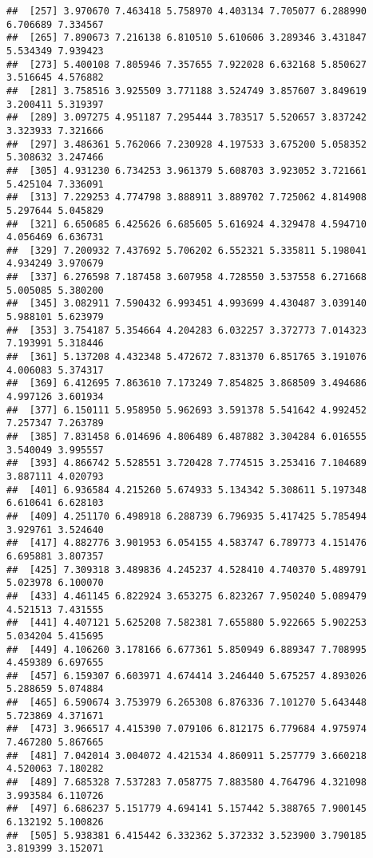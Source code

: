 \documentclass[
]{article}
\begin{document}
\begin{verbatim}
##  [257] 3.970670 7.463418 5.758970 4.403134 7.705077 6.288990 6.706689 7.334567
##  [265] 7.890673 7.216138 6.810510 5.610606 3.289346 3.431847 5.534349 7.939423
##  [273] 5.400108 7.805946 7.357655 7.922028 6.632168 5.850627 3.516645 4.576882
##  [281] 3.758516 3.925509 3.771188 3.524749 3.857607 3.849619 3.200411 5.319397
##  [289] 3.097275 4.951187 7.295444 3.783517 5.520657 3.837242 3.323933 7.321666
##  [297] 3.486361 5.762066 7.230928 4.197533 3.675200 5.058352 5.308632 3.247466
##  [305] 4.931230 6.734253 3.961379 5.608703 3.923052 3.721661 5.425104 7.336091
##  [313] 7.229253 4.774798 3.888911 3.889702 7.725062 4.814908 5.297644 5.045829
##  [321] 6.650685 6.425626 6.685605 5.616924 4.329478 4.594710 4.056469 6.636731
##  [329] 7.200932 7.437692 5.706202 6.552321 5.335811 5.198041 4.934249 3.970679
##  [337] 6.276598 7.187458 3.607958 4.728550 3.537558 6.271668 5.005085 5.380200
##  [345] 3.082911 7.590432 6.993451 4.993699 4.430487 3.039140 5.988101 5.623979
##  [353] 3.754187 5.354664 4.204283 6.032257 3.372773 7.014323 7.193991 5.318446
##  [361] 5.137208 4.432348 5.472672 7.831370 6.851765 3.191076 4.006083 5.374317
##  [369] 6.412695 7.863610 7.173249 7.854825 3.868509 3.494686 4.997126 3.601934
##  [377] 6.150111 5.958950 5.962693 3.591378 5.541642 4.992452 7.257347 7.263789
##  [385] 7.831458 6.014696 4.806489 6.487882 3.304284 6.016555 3.540049 3.995557
##  [393] 4.866742 5.528551 3.720428 7.774515 3.253416 7.104689 3.887111 4.020793
##  [401] 6.936584 4.215260 5.674933 5.134342 5.308611 5.197348 6.610641 6.628103
##  [409] 4.251170 6.498918 6.288739 6.796935 5.417425 5.785494 3.929761 3.524640
##  [417] 4.882776 3.901953 6.054155 4.583747 6.789773 4.151476 6.695881 3.807357
##  [425] 7.309318 3.489836 4.245237 4.528410 4.740370 5.489791 5.023978 6.100070
##  [433] 4.461145 6.822924 3.653275 6.823267 7.950240 5.089479 4.521513 7.431555
##  [441] 4.407121 5.625208 7.582381 7.655880 5.922665 5.902253 5.034204 5.415695
##  [449] 4.106260 3.178166 6.677361 5.850949 6.889347 7.708995 4.459389 6.697655
##  [457] 6.159307 6.603971 4.674414 3.246440 5.675257 4.893026 5.288659 5.074884
##  [465] 6.590674 3.753979 6.265308 6.876336 7.101270 5.643448 5.723869 4.371671
##  [473] 3.966517 4.415390 7.079106 6.812175 6.779684 4.975974 7.467280 5.867665
##  [481] 7.042014 3.004072 4.421534 4.860911 5.257779 3.660218 4.520063 7.180282
##  [489] 7.685328 7.537283 7.058775 7.883580 4.764796 4.321098 3.993584 6.110726
##  [497] 6.686237 5.151779 4.694141 5.157442 5.388765 7.900145 6.132192 5.100826
##  [505] 5.938381 6.415442 6.332362 5.372332 3.523900 3.790185 3.819399 3.152071

\end{verbatim}
\end{document}

